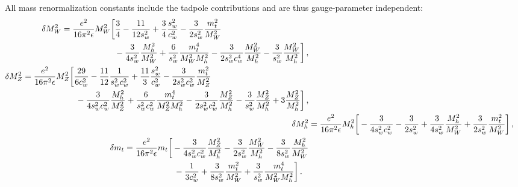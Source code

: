 \documentclass[letter,11pt,DIV=12,abstract=true,numbers=noenddot,titlepage=false,twocolumn=false,draft=false]{scrartcl}
\begin{document}
All mass renormalization constants include the tadpole contributions
and are thus gauge-parameter independent:
\begin{align}
  \begin{split}
  \delta M_W^2 & = \frac{e^2}{16\pi^2\epsilon} M_W^2
               \bigg[   \frac{3}{4}
                      - \frac{11}{12s_w^2}
                      + \frac{3}{4} \frac{s_w^2}{c_w^2}
                      - \frac{3}{2s_w^2} \frac{m_t^2}{M_W^2} \\
    & \hspace{6.4em}  - \frac{3}{4s_w^2} \frac{M_h^2}{M_W^2}
                      + \frac{6}{s_w^2} \frac{m_t^4}{M_W^2 M_h^2}
                      - \frac{3}{2s_w^2c_w^4} \frac{M_W^2}{M_h^2}
                      - \frac{3}{s_w^2} \frac{M_W^2}{M_h^2}
               \bigg] \,,
  \end{split}\\
  \begin{split}
  \delta M_Z^2 & = \frac{e^2}{16\pi^2\epsilon} M_Z^2
               \bigg[   \frac{29}{6c_w^2}
                      - \frac{11}{12} \frac{1}{s_w^2c_w^2}
                      + \frac{11}{3} \frac{s_w^2}{c_w^2}
                      - \frac{3}{2s_w^2c_w^2} \frac{m_t^2}{M_Z^2}\\
  &  \hspace{6.4em}   - \frac{3}{4s_w^2c_w^2} \frac{M_h^2}{M_Z^2}
                      + \frac{6}{s_w^2c_w^2} \frac{m_t^4}{M_Z^2 M_h^2}
                      - \frac{3}{2s_w^2c_w^2} \frac{M_Z^2}{M_h^2}
                      - \frac{3}{s_w^2} \frac{M_Z^2}{M_h^2}
                      + 3 \frac{M_Z^2}{M_h^2}
               \bigg] \,,
  \end{split}\\
  \delta M_h^2 & = \frac{e^2}{16\pi^2\epsilon} M_h^2
               \bigg[ - \frac{3}{4s_w^2c_w^2}
                      - \frac{3}{2s_w^2}
                      + \frac{3}{4s_w^2} \frac{M_h^2}{M_W^2}
                      + \frac{3}{2s_w^2} \frac{m_t^2}{M_W^2} \bigg] \,,\\
  \begin{split}
  \delta m_t & = \frac{e^2}{16\pi^2\epsilon} m_t
               \bigg[ - \frac{3}{4s_w^2c_w^2} \frac{M_Z^2}{M_h^2}
                      - \frac{3}{2s_w^2} \frac{M_W^2}{M_h^2}
                      - \frac{3}{8s_w^2} \frac{M_h^2}{M_W^2}\\
                      & \qquad \qquad \qquad
                      - \frac{1}{3c_w^2}
                      + \frac{3}{8s_w^2} \frac{m_t^2}{M_W^2}
                      + \frac{3}{s_w^2} \frac{m_t^4}{M_W^2 M_h^2} \bigg] \,.
  \end{split}
\end{align}
\end{document}
